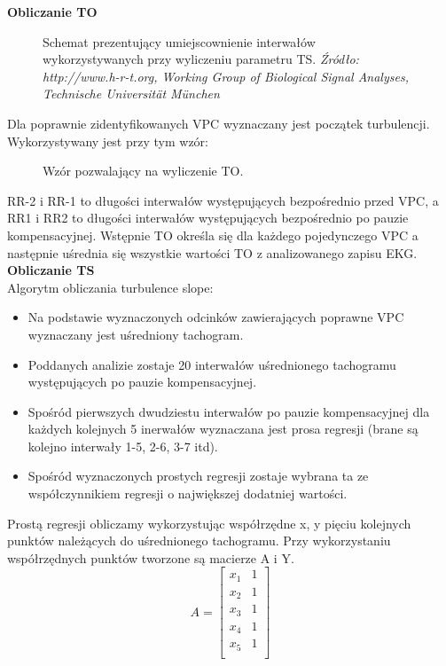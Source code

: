 \documentclass[a4paper, 11pt]{article}
\begin{document}
\textbf{Obliczanie TO}\\
\begin{figure}[h!]
\centering
\caption{Schemat prezentujący umiejscownienie interwałów wykorzystywanych przy wyliczeniu parametru TS. 
\textit{ Źródło: http://www.h-r-t.org, Working Group of Biological Signal Analyses, Technische Universität München} }
\end{figure}
Dla poprawnie zidentyfikowanych VPC wyznaczany jest początek turbulencji.
Wykorzystywany jest przy tym wzór:
\begin{figure}[h!]
\centering
\caption{Wzór pozwalający na wyliczenie TO. }
\end{figure}
\noindent RR-2 i RR-1 to długości interwałów występujących bezpośrednio przed VPC,
a RR1 i RR2 to długości interwałów występujących bezpośrednio po pauzie 
kompensacyjnej.
Wstępnie TO określa się dla każdego pojedynczego VPC a następnie uśrednia się wszystkie wartości TO z analizowanego zapisu EKG.
\textbf{Obliczanie TS}\\
Algorytm obliczania turbulence slope:
\begin{itemize}
\item Na podstawie wyznaczonych odcinków zawierających poprawne VPC wyznaczany jest 
uśredniony tachogram.
\item Poddanych analizie zostaje 20 interwałów uśrednionego tachogramu występujących po pauzie kompensacyjnej. 
\item Spośród pierwszych dwudziestu interwałów po pauzie kompensacyjnej dla każdych kolejnych 5 inerwałów wyznaczana
jest prosa regresji (brane są kolejno interwały 1-5, 2-6, 3-7 itd).
\item Spośród wyznaczonych prostych regresji zostaje wybrana ta ze współczynnikiem regresji 
o największej dodatniej wartości. 
\end{itemize}
Prostą regresji obliczamy wykorzystując współrzędne x, y pięciu kolejnych punktów należących
do uśrednionego tachogramu. Przy wykorzystaniu współrzędnych punktów tworzone są macierze
A i Y.
\begin{equation}
A =  \left[
 \begin{array}{ccc}
   x_{1} & 1 \\
   x_{2} & 1 \\
   x_{3} & 1 \\ 
   x_{4} & 1 \\
   x_{5} & 1 \\ 
 \end{array}
\right]
\end{equation}
\end{document}
